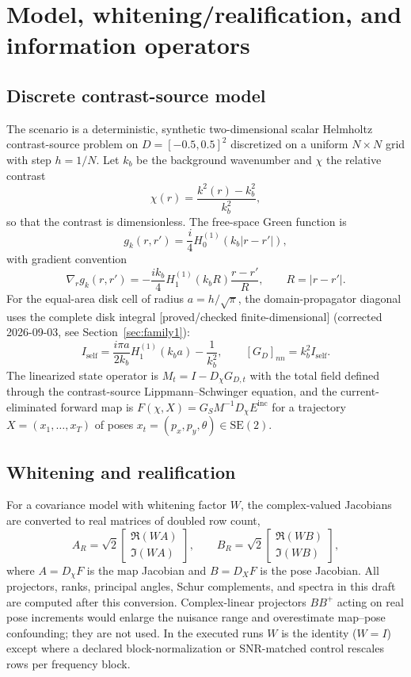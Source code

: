 \documentclass[12pt]{article}
\newcommand{\FDL}{\textnormal{[proved/checked finite-dimensional]}}
\begin{document}
\section{Model, whitening/realification, and information operators}\label{sec:model}

\subsection{Discrete contrast-source model}

The scenario is a deterministic, synthetic two-dimensional scalar Helmholtz
contrast-source problem on $D=[-0.5,0.5]^2$ discretized on a uniform $N\times
N$ grid with step $h=1/N$. Let $k_b$ be the background wavenumber and
$\chi$ the relative contrast
\[
\chi(r)=\frac{k^2(r)-k_b^2}{k_b^2},
\]
so that the contrast is dimensionless. The free-space Green function is
\[
g_k(r,r')=\frac{i}{4}H_0^{(1)}(k_b|r-r'|),
\]
with gradient convention
\[
\nabla_r g_k(r,r')=-\frac{i k_b}{4}H_1^{(1)}(k_b R)\frac{r-r'}{R},\qquad
R=|r-r'|.
\]
For the equal-area disk cell of radius $a=h/\sqrt{\pi}$, the domain-propagator
diagonal uses the complete disk integral \FDL{} (corrected 2026-09-03, see
Section~\ref{sec:family1}):
\[
I_{\mathrm{self}}=\frac{i\pi a}{2k_b}H_1^{(1)}(k_b a)-\frac{1}{k_b^2},\qquad
[G_D]_{nn}=k_b^2 I_{\mathrm{self}}.
\]
The linearized state operator is $M_t=I-D_\chi G_{D,t}$ with the total field
defined through the contrast-source Lippmann--Schwinger equation, and the
current-eliminated forward map is $F(\chi,X)=G_S M^{-1} D_\chi E^{\mathrm{inc}}$
for a trajectory $X=(x_1,\ldots,x_T)$ of poses $x_t=(p_x,p_y,\theta)\in
\mathrm{SE}(2)$.

\subsection{Whitening and realification}

For a covariance model with whitening factor $W$, the complex-valued Jacobians
are converted to real matrices of doubled row count,
\[
A_R=\sqrt{2}\begin{bmatrix}\Re(WA)\\\Im(WA)\end{bmatrix},\qquad
B_R=\sqrt{2}\begin{bmatrix}\Re(WB)\\\Im(WB)\end{bmatrix},
\]
where $A=D_\chi F$ is the map Jacobian and $B=D_X F$ is the pose Jacobian.
All projectors, ranks, principal angles, Schur complements, and spectra in
this draft are computed after this conversion. Complex-linear projectors
$BB^+$ acting on real pose increments would enlarge the nuisance range and
overestimate map--pose confounding; they are not used. In the executed runs
$W$ is the identity ($W=I$) except where a declared block-normalization or
SNR-matched control rescales rows per frequency block.
\end{document}
